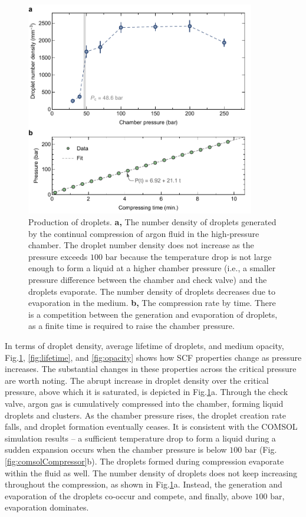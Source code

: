 \begin{figure}[ht!]
\centering
\includegraphics[width=100mm]{figures/ch2/droplet/numdens.pdf}
\caption{Production of droplets. \textbf{a,} The number density of droplets generated by the continual compression of argon fluid in the high-pressure chamber. The droplet number density does not increase as the pressure exceeds $100 \text{ bar}$ because the temperature drop is not large enough to form a liquid at a higher chamber pressure (i.e., a smaller pressure difference between the chamber and check valve) and the droplets evaporate. The number density of droplets decreases due to evaporation in the medium. \textbf{b,} The compression rate by time. There is a competition between the generation and evaporation of droplets, as a finite time is required to raise the chamber pressure.}
\label{fig:numdens}
\end{figure}

In terms of droplet density, average lifetime of droplets, and medium opacity, Fig.\ref{fig:numdens}, \ref{fig:lifetime}, and \ref{fig:opacity} shows how SCF properties change as pressure increases. The substantial changes in these properties across the critical pressure are worth noting. The abrupt increase in droplet density over the critical pressure, above which it is saturated, is depicted in Fig.\ref{fig:numdens}a. Through the check valve, argon gas is cumulatively compressed into the chamber, forming liquid droplets and clusters. As the chamber pressure rises, the droplet creation rate falls, and droplet formation eventually ceases. It is consistent with the COMSOL simulation results – a sufficient temperature drop to form a liquid during a sudden expansion occurs when the chamber pressure is below $100 \text{ bar}$ (Fig.\ref{fig:comsolCompressor}b). The droplets formed during compression evaporate within the fluid as well. The number density of droplets does not keep increasing throughout the compression, as shown in Fig.\ref{fig:numdens}a. Instead, the generation and evaporation of the droplets co-occur and compete, and finally, above $100 \text{ bar}$, evaporation dominates.

